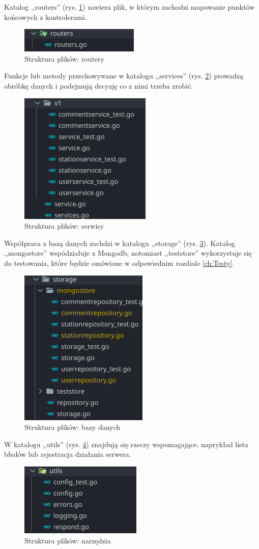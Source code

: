 Katalog ,,routers'' (rys. \ref{fig:routers}) zawiera plik, w którym zachodzi mapowanie punktów końcowych z kontrolerami.
\begin{figure}[ht]
\centering
\includegraphics[width=0.25\linewidth]{rys03/routers.png}
\caption{Struktura plików: routery}
\label{fig:routers}
\end{figure}

Funkcje lub metody przechowywane w katalogu ,,services'' (rys. \ref{fig:services}) prowadzą obróbkę danych i podejmują decyzję co z nimi trzeba zrobić.
\begin{figure}[ht]
    \centering
        \includegraphics[width=0.25\linewidth]{rys03/services.png}
        \caption{Struktura plików: serwisy}
    \label{fig:services}
\end{figure}

Współpraca z bazą danych zachdzi w katalogu ,,storage'' (rys. \ref{fig:storage}). Katalog ,,mongostore'' wspódziałuje z Mongodb, notomiast ,,teststore'' wykorzystuje się do testowania, które będzie omówione w odpowiednim rozdiale \ref{ch:Testy}.
\begin{figure}[ht]
    \centering
        \includegraphics[width=0.25\linewidth]{rys03/storage.png}
        \caption{Struktura plików: bazy danych}
    \label{fig:storage}
\end{figure}

W katalogu ,,utils'' (rys. \ref{fig:utils}) znajdują się rzeczy wspomagające, naprykład lista błedów lub rejestracja działania serwera.
\begin{figure}[ht]
    \centering
        \includegraphics[width=0.25\linewidth]{rys03/utils.png}
        \caption{Struktura plików: narzędzia}
    \label{fig:utils}
\end{figure}

